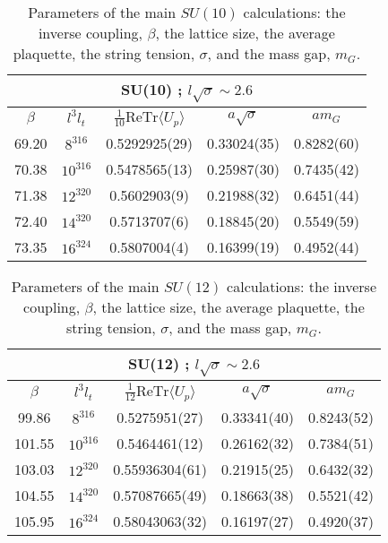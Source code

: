 \documentclass[12pt]{article}
\begin{document}
\begin{table}[htb]
\centering
\begin{tabular}{|cc|ccc|} \hline
\multicolumn{5}{|c|}{SU(10) ; $l\surd\sigma\sim 2.6$} \\ \hline
 $\beta$ & $l^3l_t$ & $\tfrac{1}{10}\text{ReTr}\langle U_p\rangle$ & 
$a\surd\sigma$ & $am_G$  \\ \hline
69.20    & $8^316$   & 0.5292925(29) & 0.33024(35)  & 0.8282(60)  \\
70.38    & $10^316$  & 0.5478565(13) & 0.25987(30)  & 0.7435(42)  \\
71.38    & $12^320$  & 0.5602903(9)  & 0.21988(32)  & 0.6451(44)  \\
72.40    & $14^320$  & 0.5713707(6)  & 0.18845(20)  & 0.5549(59)  \\
73.35    & $16^324$  & 0.5807004(4)  & 0.16399(19)  & 0.4952(44)  \\ \hline
\end{tabular}
\caption{Parameters of the main $SU(10)$ calculations: the inverse coupling, $\beta$, the lattice size, the
  average plaquette, the string tension, $\sigma$, and the  mass gap, $m_G$.}
\label{table_param_SU10}
\end{table}


\begin{table}[htb]
\centering
\begin{tabular}{|cc|ccc|} \hline
\multicolumn{5}{|c|}{SU(12) ; $l\surd\sigma\sim 2.6$} \\ \hline
$\beta$ & $l^3l_t$ & $\tfrac{1}{12}\text{ReTr}\langle U_p\rangle$ & 
$a\surd\sigma$ & $am_G$  \\ \hline
 99.86   & $8^316$   & 0.5275951(27)   & 0.33341(40)  & 0.8243(52)  \\
 101.55  & $10^316$  & 0.5464461(12)   & 0.26162(32)  & 0.7384(51)  \\
 103.03  & $12^320$  & 0.55936304(61)  & 0.21915(25)  & 0.6432(32)  \\
 104.55  & $14^320$  & 0.57087665(49)  & 0.18663(38)  & 0.5521(42)  \\
 105.95  & $16^324$  & 0.58043063(32)  & 0.16197(27)  & 0.4920(37)  \\ \hline
\end{tabular}
\caption{Parameters of the main $SU(12)$ calculations: the inverse coupling, $\beta$, the lattice size, the
  average plaquette, the string tension, $\sigma$, and the  mass gap, $m_G$.}
\label{table_param_SU12}
\end{table}
\end{document}
